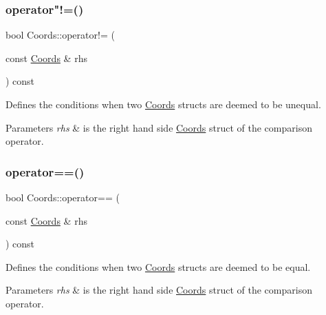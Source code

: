 \subsubsection{\texorpdfstring{operator"!=()}{operator!=()}}
{\footnotesize\ttfamily bool Coords\+::operator!= (\begin{DoxyParamCaption}\item[{const \hyperlink{struct_coords}{Coords} \&}]{rhs }\end{DoxyParamCaption}) const\hspace{0.3cm}{\ttfamily [inline]}}



Defines the conditions when two \hyperlink{struct_coords}{Coords} structs are deemed to be unequal. 


\begin{DoxyParams}{Parameters}
{\em rhs} & is the right hand side \hyperlink{struct_coords}{Coords} struct of the comparison operator. \\
\hline
\end{DoxyParams}
\mbox{\label{struct_coords_ad3347f6568814df1a2b98b3cd0b78632}} 
\subsubsection{\texorpdfstring{operator==()}{operator==()}}
{\footnotesize\ttfamily bool Coords\+::operator== (\begin{DoxyParamCaption}\item[{const \hyperlink{struct_coords}{Coords} \&}]{rhs }\end{DoxyParamCaption}) const\hspace{0.3cm}{\ttfamily [inline]}}



Defines the conditions when two \hyperlink{struct_coords}{Coords} structs are deemed to be equal. 


\begin{DoxyParams}{Parameters}
{\em rhs} & is the right hand side \hyperlink{struct_coords}{Coords} struct of the comparison operator. \\
\hline
\end{DoxyParams}
\mbox{\label{struct_coords_a88de3a6ee710766eb9c9444cee45a9f3}} 
